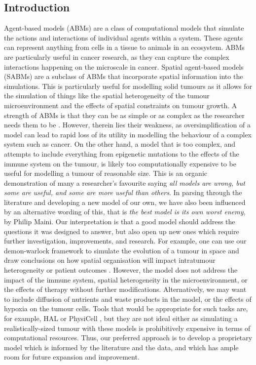 \subsection{Introduction}
Agent-based models (ABMs) are a class of computational models that simulate the actions and interactions of individual
agents within a system. These agents can represent anything from cells in a tissue to animals in an ecosystem. ABMs
are particularly useful in cancer research, as they can capture the complex interactions happening on the microscale in
cancer. Spatial agent-based models (SABMs) are a subclass of ABMs that incorporate spatial information into the
simulations. This is particularly useful for modelling solid tumours as it allows for the simulation of things like
the spatial heterogeneity of the tumour microenvironment and the effects of spatial constraints on tumour growth.
A strength of ABMs is that they can be as simple or as complex as the researcher needs them to be \cite{colyer_seven-step_2023}.
However, therein lies their weakness, as oversimplification of a model can lead to rapid loss of its utility in
modelling the behaviour of a complex system such as cancer. On the other hand, a model that is too complex, and
attempts to include everything from epigenetic mutations to the effects of the immune system on the tumour, is likely
too computationally expensive to be useful for modelling a tumour of reasonable size. This is an organic demonstration
of many a researcher's favourite saying \textit{all models are wrong, but some are useful, and some are more useful
than others}. In parsing through the literature and developing a new model of our own, we have also been influenced
by an alternative wording of this, that is \textit{the best model is its own worst enemy}, by Philip Maini. Our
interpretation is that a good model should address the questions it was designed to answer, but also open up new
ones which require further investigation, improvements, and research. For example, one can use our demon-warlock
framework \cite{bak_warlock_2023} to simulate the evolution of a tumour in space and draw conclusions on how
spatial organisation will impact intratumour heterogeneity or patient outcomes \cite{noble_when_2020, noble_spatial_2022}.
However, the model does not address the impact of the immune system, spatial heterogeneity in the microenvironment,
or the effects of therapy without further modifications. Alternatively, we may want to include diffusion of
nutrients and waste products in the model, or the effects of hypoxia on the tumour cells. Tools that would be
appropriate for such tasks are, for example, HAL \cite{bravo_hybrid_2020} or PhysiCell \cite{ghaffarizadeh_physicell_2018},
but they are not ideal either as simulating a realistically-sized tumour with these models is prohibitively expensive
in terms of computational resources. Thus, our preferred approach is to develop a proprietary model which is
informed by the literature and the data, and which has ample room for future expansion and improvement.

